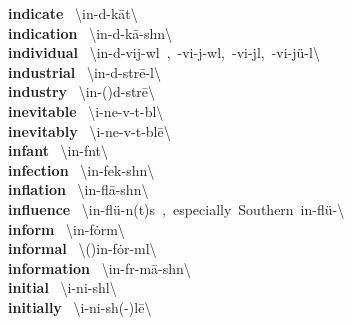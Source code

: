 \documentclass[10pt,a4paper]{article}
\begin{document}
\begin{multicols}{2}
\textbf{ indicate }\quad \ \textbackslash \textprimstress in-d\textschwa -\textsecstress k\={a}t\textbackslash \\
\textbf{ indication }\quad \ \textbackslash \textsecstress in-d\textschwa -\textprimstress k\={a}-sh\textschwa n\textbackslash \\
\textbf{ individual }\quad \ \textbackslash \textsecstress in-d\textschwa -\textprimstress vij-w\textschwa l\ ,\ -\textprimstress vi-j\textschwa -w\textschwa l,\ -\textprimstress vi-j\textschwa l,\ -\textprimstress vi-j\"{u}-\textschwa l\textbackslash \\
\textbf{ industrial }\quad \ \textbackslash in-\textprimstress d\textschwa -str\={e}-\textschwa l\textbackslash \\
\textbf{ industry }\quad \ \textbackslash \textprimstress in-(\textsecstress )d\textschwa -str\={e}\textbackslash \\
\textbf{ inevitable }\quad \ \textbackslash i-\textprimstress ne-v\textschwa -t\textschwa -b\textschwa l\textbackslash \\
\textbf{ inevitably }\quad \ \textbackslash i-\textprimstress ne-v\textschwa -t\textschwa -bl\={e}\textbackslash \\
\textbf{ infant }\quad \ \textbackslash \textprimstress in-f\textschwa nt\textbackslash \\
\textbf{ infection }\quad \ \textbackslash in-\textprimstress fek-sh\textschwa n\textbackslash \\
\textbf{ inflation }\quad \ \textbackslash in-\textprimstress fl\={a}-sh\textschwa n\textbackslash \\
\textbf{ influence }\quad \ \textbackslash \textprimstress in-\textsecstress fl\"{u}-\textschwa n(t)s\ ,\ especially\ Southern\ in-\textprimstress fl\"{u}-\textbackslash \\
\textbf{ inform }\quad \ \textbackslash in-\textprimstress f\.{o}rm\textbackslash \\
\textbf{ informal }\quad \ \textbackslash (\textsecstress )in-\textprimstress f\.{o}r-m\textschwa l\textbackslash \\
\textbf{ information }\quad \ \textbackslash \textsecstress in-f\textschwa r-\textprimstress m\={a}-sh\textschwa n\textbackslash \\
\textbf{ initial }\quad \ \textbackslash i-\textprimstress ni-sh\textschwa l\textbackslash \\
\textbf{ initially }\quad \ \textbackslash i-\textprimstress ni-sh(\textschwa -)l\={e}\textbackslash \\

\end{multicols}
\end{document}

